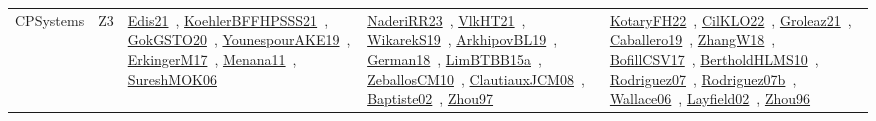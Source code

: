 {\begin{longtable}{lp{3cm}>{\raggedright\arraybackslash}p{6cm}>{\raggedright\arraybackslash}p{6cm}>{\raggedright\arraybackslash}p{8cm}}
\index{Z3}\index{CPSystems!Z3}CPSystems & Z3 & \href{../works/Edis21.pdf}{Edis21}~\cite{Edis21}, \href{../works/KoehlerBFFHPSSS21.pdf}{KoehlerBFFHPSSS21}~\cite{KoehlerBFFHPSSS21}, \href{../works/GokGSTO20.pdf}{GokGSTO20}~\cite{GokGSTO20}, \href{../works/YounespourAKE19.pdf}{YounespourAKE19}~\cite{YounespourAKE19}, \href{../works/ErkingerM17.pdf}{ErkingerM17}~\cite{ErkingerM17}, \href{../works/Menana11.pdf}{Menana11}~\cite{Menana11}, \href{../works/SureshMOK06.pdf}{SureshMOK06}~\cite{SureshMOK06} & \href{../works/NaderiRR23.pdf}{NaderiRR23}~\cite{NaderiRR23}, \href{../works/VlkHT21.pdf}{VlkHT21}~\cite{VlkHT21}, \href{../works/WikarekS19.pdf}{WikarekS19}~\cite{WikarekS19}, \href{../works/ArkhipovBL19.pdf}{ArkhipovBL19}~\cite{ArkhipovBL19}, \href{../works/German18.pdf}{German18}~\cite{German18}, \href{../works/LimBTBB15a.pdf}{LimBTBB15a}~\cite{LimBTBB15a}, \href{../works/ZeballosCM10.pdf}{ZeballosCM10}~\cite{ZeballosCM10}, \href{../works/ClautiauxJCM08.pdf}{ClautiauxJCM08}~\cite{ClautiauxJCM08}, \href{../works/Baptiste02.pdf}{Baptiste02}~\cite{Baptiste02}, \href{../works/Zhou97.pdf}{Zhou97}~\cite{Zhou97} & \href{../works/KotaryFH22.pdf}{KotaryFH22}~\cite{KotaryFH22}, \href{../works/CilKLO22.pdf}{CilKLO22}~\cite{CilKLO22}, \href{../works/Groleaz21.pdf}{Groleaz21}~\cite{Groleaz21}, \href{../works/Caballero19.pdf}{Caballero19}~\cite{Caballero19}, \href{../works/ZhangW18.pdf}{ZhangW18}~\cite{ZhangW18}, \href{../works/BofillCSV17.pdf}{BofillCSV17}~\cite{BofillCSV17}, \href{../works/BertholdHLMS10.pdf}{BertholdHLMS10}~\cite{BertholdHLMS10}, \href{../works/Rodriguez07.pdf}{Rodriguez07}~\cite{Rodriguez07}, \href{../works/Rodriguez07b.pdf}{Rodriguez07b}~\cite{Rodriguez07b}, \href{../works/Wallace06.pdf}{Wallace06}~\cite{Wallace06}, \href{../works/Layfield02.pdf}{Layfield02}~\cite{Layfield02}, \href{../works/Zhou96.pdf}{Zhou96}~\cite{Zhou96}\\
\end{longtable}
}


